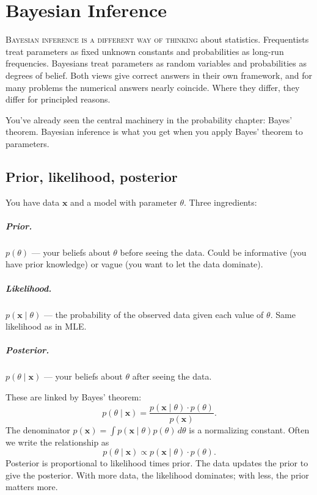 \chapter{Bayesian Inference}
\label{ch:bayesian}

\noindent\textsc{Bayesian inference is a different way of thinking} about statistics. Frequentists treat parameters as fixed unknown constants and probabilities as long-run frequencies. Bayesians treat parameters as random variables and probabilities as degrees of belief. Both views give correct answers in their own framework, and for many problems the numerical answers nearly coincide. Where they differ, they differ for principled reasons.

You've already seen the central machinery in the probability chapter: Bayes' theorem. Bayesian inference is what you get when you apply Bayes' theorem to parameters.

\section{Prior, likelihood, posterior}

You have data $\bm{x}$ and a model with parameter $\theta$. Three ingredients:

\paragraph{Prior.} $p(\theta)$ — your beliefs about $\theta$ before seeing the data. Could be informative (you have prior knowledge) or vague (you want to let the data dominate).

\paragraph{Likelihood.} $p(\bm{x} \mid \theta)$ — the probability of the observed data given each value of $\theta$. Same likelihood as in MLE.

\paragraph{Posterior.} $p(\theta \mid \bm{x})$ — your beliefs about $\theta$ after seeing the data.

These are linked by Bayes' theorem:
\begin{equation}
  \boxed{p(\theta \mid \bm{x}) = \frac{p(\bm{x} \mid \theta) \cdot p(\theta)}{p(\bm{x})}.}
  \label{eq:bayes-inference}
\end{equation}
The denominator $p(\bm{x}) = \int p(\bm{x} \mid \theta) p(\theta)\, d\theta$ is a normalizing constant. Often we write the relationship as
\[
  p(\theta \mid \bm{x}) \propto p(\bm{x} \mid \theta) \cdot p(\theta).
\]
Posterior is proportional to likelihood times prior. The data updates the prior to give the posterior. With more data, the likelihood dominates; with less, the prior matters more.

